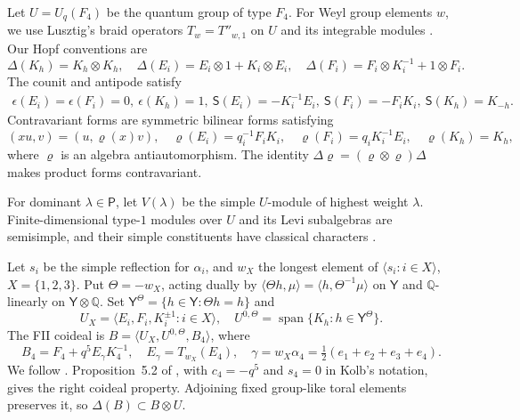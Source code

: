 \documentclass[12pt,reqno]{amsart}
\theoremstyle{plain}
\theoremstyle{definition}
\numberwithin{equation}{section}
\newcommand{\eps}{\epsilon}
\newcommand{\Span}{\operatorname{span}}
\newcommand{\tens}{\otimes}
\begin{document}
Let $U=U_q(F_4)$ be the quantum group of type $F_4$.
For Weyl group elements $w$, we use Lusztig's braid operators
$T_w=T''_{w,1}$ on $U$ and its integrable modules
\cite[37.1.3, 39.4.4 and~39.4.7]{Lus}.
Our Hopf conventions are
\begin{equation}\label{eq:coproduct}
		\Delta(K_h)=K_h\tens K_h,\quad
		\Delta(E_i)=E_i\tens1+K_i\tens E_i,\quad
		\Delta(F_i)=F_i\tens K_i^{-1}+1\tens F_i.
\end{equation}
The counit and antipode satisfy
\[
\begin{gathered}
	\eps(E_i)=\eps(F_i)=0,\  \eps(K_h)=1,\ 
	\mathsf S(E_i)=-K_i^{-1}E_i,\ 
	\mathsf S(F_i)=-F_iK_i,\ 
	\mathsf S(K_h)=K_{-h}.
\end{gathered}
\]
Contravariant forms are symmetric bilinear forms satisfying
\begin{equation}\label{eq:contravariance}
		(xu,v)=(u,\varrho(x)v),\quad
		\varrho(E_i)=q_i^{-1}F_iK_i,\quad
		\varrho(F_i)=q_iK_i^{-1}E_i,\quad
		\varrho(K_h)=K_h,
\end{equation}
where $\varrho$ is an algebra antiautomorphism.
The identity $\Delta\varrho=(\varrho\tens\varrho)\Delta$ makes
product forms contravariant.

For dominant $\lambda\in\mathsf P$, let $V(\lambda)$ be the simple
$U$-module of highest weight $\lambda$.
Finite-dimensional type-$1$ modules over $U$ and its Levi subalgebras
are semisimple, and their simple constituents have classical characters
\cite[Proposition~6.3.4(b) and Theorem~33.1.3(d)]{Lus}.

Let $s_i$ be the simple reflection for $\alpha_i$, and $w_X$ the
longest element of $\langle s_i:i\in X\rangle$, $X=\{1,2,3\}$.
Put $\Theta=-w_X$, acting dually by
$\langle\Theta h,\mu\rangle=\langle h,\Theta^{-1}\mu\rangle$
on $\mathsf Y$ and $\mathbb Q$-linearly on $\mathsf Y\otimes\mathbb Q$.
Set $\mathsf Y^\Theta=\{h\in\mathsf Y:\Theta h=h\}$ and
\[
U_X=\langle E_i,F_i,K_i^{\pm1}:i\in X\rangle,\quad
U^{0,\Theta}=\Span\{K_h:h\in\mathsf Y^\Theta\}.
\]
The FII coideal is $B=\langle U_X,U^{0,\Theta},B_4\rangle$, where
\begin{equation}\label{eq:B4}
		B_4=F_4+q^5E_\gamma K_4^{-1},\quad
		E_\gamma=T_{w_X}(E_4),\quad
		\gamma=w_X\alpha_4=\tfrac12(e_1+e_2+e_3+e_4).
\end{equation}
We follow \cite[Definition~2.4]{Sch26}.
Proposition~5.2 of \cite{Kol14}, with $c_4=-q^5$ and $s_4=0$
in Kolb's notation, gives the right coideal property. Adjoining fixed
group-like toral elements preserves it, so $\Delta(B)\subset B\tens U$.
\end{document}
